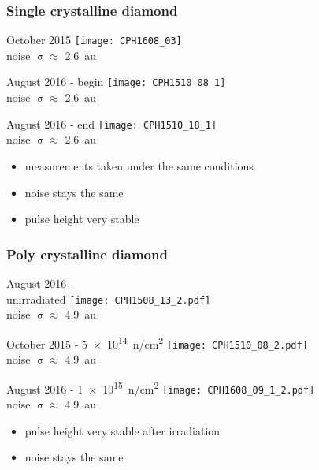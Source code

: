 \begin{frame}
	\frametitle{Single crystalline diamond}
	\def \sp {3.7cm}
	\begin{minipage}{\sp}
		\centering
		October 2015 
		\texttt{[image: CPH1608\_03]}\\
		noise $\upsigma\approx$ \SI{2.6}{au}
	\end{minipage}
	\hspace*{2pt}
	\begin{minipage}{\sp}
		\centering
		August 2016 - begin
		\texttt{[image: CPH1510\_08\_1]}\\
		noise $\upsigma\approx$ \SI{2.6}{au}
	\end{minipage}
	\hspace*{2pt}
	\begin{minipage}{\sp}
		\centering
		August 2016 - end
		\texttt{[image: CPH1510\_18\_1]}\\
		noise $\upsigma \approx$ \SI{2.6}{au}
	\end{minipage}\s
	\begin{itemize}
		\item measurements taken under the same conditions
		\item noise stays the same
		\item pulse height very stable
	\end{itemize}
\end{frame}
\begin{frame}
	\frametitle{Poly crystalline diamond}
	\begin{minipage}{3.7cm}
		\centering
		August 2016 - \\unirradiated
		\texttt{[image: CPH1508\_13\_2.pdf]}\\
		noise $\upsigma\approx$ \SI{4.9}{au}
	\end{minipage}
	\hspace*{2pt}
	\begin{minipage}{3.7cm}
		\centering
		October 2015 - \SI[exponent-product = \cdot]{5e14}{n/cm^{2}}
		\texttt{[image: CPH1510\_08\_2.pdf]}\\
		noise $\upsigma\approx$ \SI{4.9}{au}
	\end{minipage}
	\hspace*{2pt}
	\begin{minipage}{3.7cm}
		\centering
		August 2016 - \SI[exponent-product = \cdot]{1e15}{n/cm^{2}}
		\texttt{[image: CPH1608\_09\_1\_2.pdf]}\\
		noise $\upsigma \approx$ \SI{4.9}{au}
	\end{minipage}\s
	\begin{itemize}
		\item pulse height very stable after irradiation
		\item noise stays the same
	\end{itemize}
\end{frame}
